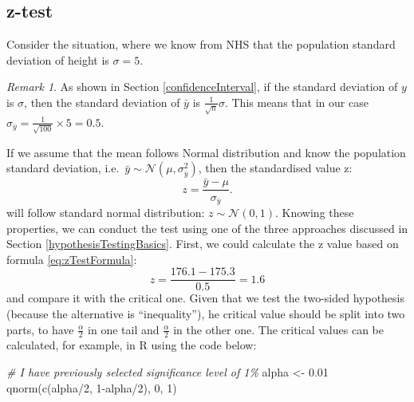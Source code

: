 \documentclass[
]{book}
\newenvironment{Shaded}{\begin{snugshade}}{\end{snugshade}}
\newcommand{\CommentTok}[1]{\textcolor[rgb]{0.56,0.35,0.01}{\textit{#1}}}
\newcommand{\DecValTok}[1]{\textcolor[rgb]{0.00,0.00,0.81}{#1}}
\newcommand{\FloatTok}[1]{\textcolor[rgb]{0.00,0.00,0.81}{#1}}
\newcommand{\FunctionTok}[1]{\textcolor[rgb]{0.00,0.00,0.00}{#1}}
\newcommand{\NormalTok}[1]{#1}
\newcommand{\OtherTok}[1]{\textcolor[rgb]{0.56,0.35,0.01}{#1}}
\newcommand{\SpecialCharTok}[1]{\textcolor[rgb]{0.00,0.00,0.00}{#1}}
\theoremstyle{definition}
\theoremstyle{definition}
\theoremstyle{definition}
\theoremstyle{definition}
\theoremstyle{remark}
\newtheorem*{remark}{Remark}
\begin{document}
\hypertarget{statisticalTestsOneSampleMeanZ}{%
\subsection{z-test}\label{statisticalTestsOneSampleMeanZ}}

Consider the situation, where we know from NHS that the population standard deviation of height is \(\sigma=5\).

\begin{remark}
As shown in Section \ref{confidenceInterval}, if the standard deviation of \(y\) is \(\sigma\), then the standard deviation of \(\bar{y}\) is \(\frac{1}{\sqrt{n}} \sigma\). This means that in our case \(\sigma_{\bar{y}}=\frac{1}{\sqrt{100}} \times 5 =0.5\).
\end{remark}

If we assume that the mean follows Normal distribution and know the population standard deviation, i.e.~\(\bar{y} \sim \mathcal{N}\left(\mu, \sigma^2_{\bar{y}}\right)\), then the standardised value z:
\begin{equation}
    z = \frac{\bar{y}-\mu}{\sigma_{\bar{y}}} .
    \label{eq:zTestFormula}
\end{equation}
will follow standard normal distribution: \(z \sim \mathcal{N}\left(0, 1\right)\). Knowing these properties, we can conduct the test using one of the three approaches discussed in Section \ref{hypothesisTestingBasics}. First, we could calculate the z value based on formula \eqref{eq:zTestFormula}:
\begin{equation*}
    z = \frac{176.1 -175.3}{0.5} = 1.6 
\end{equation*}
and compare it with the critical one. Given that we test the two-sided hypothesis (because the alternative is ``inequality''), he critical value should be split into two parts, to have \(\frac{\alpha}{2}\) in one tail and \(\frac{\alpha}{2}\) in the other one. The critical values can be calculated, for example, in R using the code below:

\begin{Shaded}
\begin{Highlighting}[]
\CommentTok{\# I have previously selected significance level of 1\%}
\NormalTok{alpha }\OtherTok{\textless{}{-}} \FloatTok{0.01}
\FunctionTok{qnorm}\NormalTok{(}\FunctionTok{c}\NormalTok{(alpha}\SpecialCharTok{/}\DecValTok{2}\NormalTok{, }\DecValTok{1}\SpecialCharTok{{-}}\NormalTok{alpha}\SpecialCharTok{/}\DecValTok{2}\NormalTok{), }\DecValTok{0}\NormalTok{, }\DecValTok{1}\NormalTok{)}
\end{Highlighting}
\end{Shaded}
\end{document}
